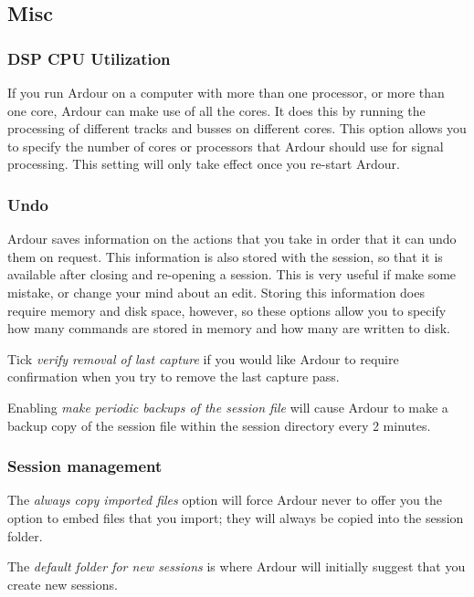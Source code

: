 \documentclass[10pt,a4paper]{book}
\begin{document}
{\subsection{Misc}

\subsubsection{DSP CPU Utilization}

If you run Ardour on a computer with more than one processor, or more
than one core, Ardour can make use of all the cores.  It does this by
running the processing of different tracks and busses on different
cores.  This option allows you to specify the number of cores or
processors that Ardour should use for signal processing.  This setting
will only take effect once you re-start Ardour.

\subsubsection{Undo}

Ardour saves information on the actions that you take in order that it
can undo them on request.  This information is also stored with the
session, so that it is available after closing and re-opening a
session.  This is very useful if make some mistake, or change your
mind about an edit.  Storing this information does require memory and
disk space, however, so these options allow you to specify how many
commands are stored in memory and how many are written to disk.

Tick \emph{verify removal of last capture} if you would like Ardour to
require confirmation when you try to remove the last capture pass.

Enabling \emph{make periodic backups of the session file} will cause
Ardour to make a backup copy of the session file within the session
directory every 2 minutes.

\subsubsection{Session management}

The \emph{always copy imported files} option will force Ardour never
to offer you the option to embed files that you import; they will
always be copied into the session folder.

The \emph{default folder for new sessions} is where Ardour will
initially suggest that you create new sessions.

}
\end{document}
